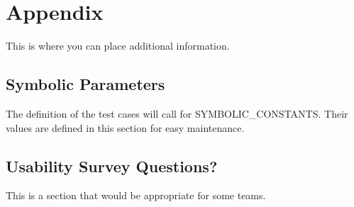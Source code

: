 \documentclass[12pt, titlepage]{article}
\begin{document}




\newpage

\section{Appendix}

This is where you can place additional information.

\subsection{Symbolic Parameters}

The definition of the test cases will call for SYMBOLIC\_CONSTANTS.
Their values are defined in this section for easy maintenance.

\subsection{Usability Survey Questions?}

This is a section that would be appropriate for some teams.
\end{document}
